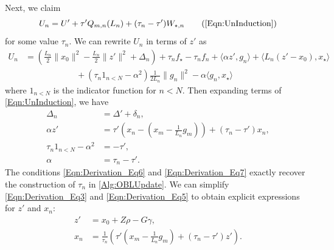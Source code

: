 \documentclass[11pt]{article}
\numberwithin{equation}{section}
\newcommand{\Ucoef}{\rho}
\newcommand{\Wcoef}{\gamma}
\newcommand{\idxArgmin}{m}
\newcommand{\indicator}[1]{1_{#1}}
\newcommand{\norm}[1]{\|{#1}\|}
\theoremstyle{definition}
\theoremstyle{plain}
\theoremstyle{definition}
\begin{document}
Next, we claim 
\begin{equation}
    U_n = U' + \tau' Q_{m,n}(L_n) + (\tau_n - \tau') W_{\star,n} \tag{\ref{Eqn:UnInduction}}
\end{equation}
for some value $\tau_n$. We can rewrite $U_n$ in terms of $z'$ as
\begin{align*}
    U_n &=  \left(\frac{L_n}{2}\norm{x_0}^2 - \frac{L_n}{2} \norm{z'}^2 + \Delta_n \right) + \tau_n f_\star - \tau_n f_n + \langle \alpha z', g_n \rangle + \langle L_n(z' - x_0), x_\star \rangle \\
    & \qquad \qquad \qquad + (\tau_n \indicator{n<N} - \alpha^2 ) \frac{1}{2L_n}\|g_n\|^2 -\alpha \langle g_n, x_\star \rangle
\end{align*}
where $\indicator{n<N}$ is the indicator function for $n<N$.
Then expanding terms of \eqref{Eqn:UnInduction}, we have
\begin{align}
    \Delta_n &= \Delta' + \delta_n, \label{Eqn:Derivation_Eq4} \\
    \alpha z' &= \tau' \left(x_n - (x_\idxArgmin - \frac{1}{L_n} g_\idxArgmin)\right) + (\tau_n - \tau') x_n, \label{Eqn:Derivation_Eq5} \\
    \tau_n \indicator{n<N} - \alpha^2 & = -\tau', \label{Eqn:Derivation_Eq6} \\
    \alpha & = \tau_n - \tau'. \label{Eqn:Derivation_Eq7} 
\end{align}
The conditions \eqref{Eqn:Derivation_Eq6} and \eqref{Eqn:Derivation_Eq7} exactly recover the construction of $\tau_n$ in \cref{Alg:OBLUpdate}.
We can simplify \eqref{Eqn:Derivation_Eq3} and \eqref{Eqn:Derivation_Eq5} to obtain explicit expressions for $z'$ and $x_n$:
\begin{align}
    z' &= x_0 + Z \Ucoef - G \Wcoef, \\
    x_n & = \frac{1}{\tau_n}\left(\tau'(x_\idxArgmin - \frac{1}{L_n} g_\idxArgmin) + (\tau_n - \tau') z' \right).
\end{align}
\end{document}
